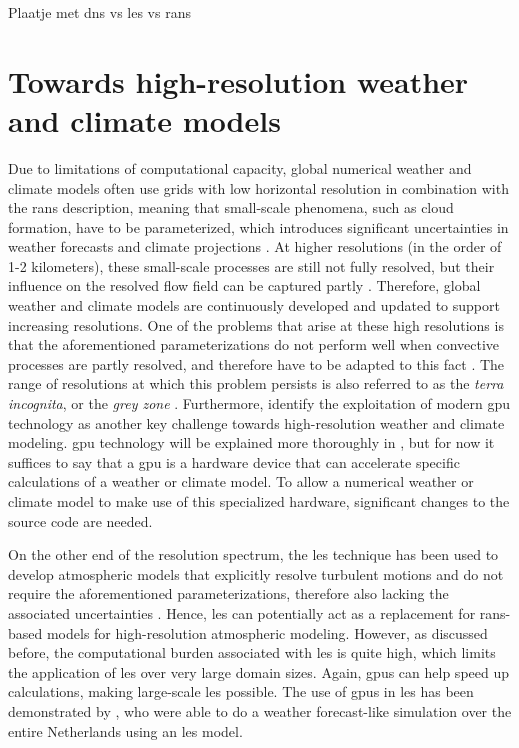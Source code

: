 Plaatje met dns vs les vs rans
\section{Towards high-resolution weather and climate models}
Due to limitations of computational capacity, global numerical weather and climate models often use grids with low horizontal resolution in combination with the \acrshort{rans} description, meaning that small-scale phenomena, such as cloud formation, have to be parameterized, which introduces significant uncertainties in weather forecasts and climate projections \citep{slingoUncertaintyWeatherClimate2011}. At higher resolutions (in the order of 1-2 kilometers), these small-scale processes are still not fully resolved, but their influence on the resolved flow field can be captured partly \citep{scharKilometerScaleClimateModels2020}. Therefore, global weather and climate models are continuously developed and updated to support increasing resolutions. One of the problems that arise at these high resolutions is that the aforementioned parameterizations do not perform well when convective processes are partly resolved, and therefore have to be adapted to this fact \citep{wyngaardNumericalModelingTerra2004}. The range of resolutions at which this problem persists is also referred to as the \emph{terra incognita}, or the \emph{grey zone} \citep{schalkwijkWeatherForecastingUsing2015,wyngaardNumericalModelingTerra2004}. Furthermore, \citet{scharKilometerScaleClimateModels2020} identify the exploitation of modern \acrlong{gpu} technology as another key challenge towards high-resolution weather and climate modeling. \acrshort{gpu} technology will be explained more thoroughly in , but for now it suffices to say that a \acrshort{gpu} is a hardware device that can accelerate specific calculations of a weather or climate model. To allow a numerical weather or climate model to make use of this specialized hardware, significant changes to the source code are needed.

On the other end of the resolution spectrum, the \acrshort{les} technique has been used to develop atmospheric models that explicitly resolve turbulent motions and do not require the aforementioned parameterizations, therefore also lacking the associated uncertainties \citep{schalkwijkWeatherForecastingUsing2015}. Hence, \acrshort{les} can potentially act as a replacement for \acrshort{rans}-based models for high-resolution atmospheric modeling. However, as discussed before, the computational burden associated with \acrshort{les} is quite high, which limits the application of \acrshort{les} over very large domain sizes. Again, \acrshort{gpu}s can help speed up calculations, making large-scale \acrshort{les} possible. The use of \acrshort{gpu}s in \acrshort{les} has been demonstrated by \citet{schalkwijkWeatherForecastingUsing2015}, who were able to do a weather forecast-like simulation over the entire Netherlands using an \acrshort{les} model.

